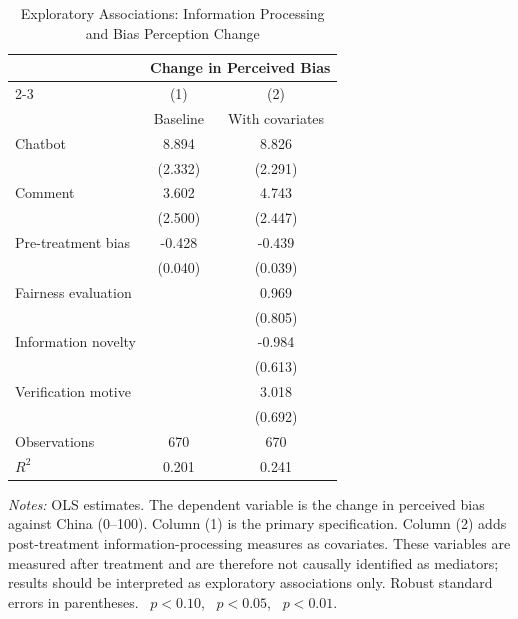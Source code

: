 \begin{table}[htbp]
\centering
\caption{Exploratory Associations: Information Processing and Bias Perception Change}
\label{tab:assoc}
\begin{tabular}{l*{2}{c}}
\toprule
 & \multicolumn{2}{c}{Change in Perceived Bias} \\
\cmidrule(lr){2-3}
                    &\multicolumn{1}{c}{(1)}&\multicolumn{1}{c}{(2)}\\
                    &\multicolumn{1}{c}{Baseline}&\multicolumn{1}{c}{With covariates}\\
\midrule
Chatbot             &       8.894\sym{***}&       8.826\sym{***}\\
                    &     (2.332)         &     (2.291)         \\
\addlinespace
Comment             &       3.602         &       4.743\sym{*}  \\
                    &     (2.500)         &     (2.447)         \\
\addlinespace
Pre-treatment bias  &      -0.428\sym{***}&      -0.439\sym{***}\\
                    &     (0.040)         &     (0.039)         \\
\addlinespace
Fairness evaluation &                     &       0.969         \\
                    &                     &     (0.805)         \\
\addlinespace
Information novelty &                     &      -0.984         \\
                    &                     &     (0.613)         \\
\addlinespace
Verification motive &                     &       3.018\sym{***}\\
                    &                     &     (0.692)         \\
\midrule
Observations        &         670         &         670         \\
$R^2$               &       0.201         &       0.241         \\
\bottomrule
\end{tabular}
\par\vspace{4pt}
\begin{minipage}{\textwidth}
\footnotesize \textit{Notes:} OLS estimates. The dependent variable is the change in perceived bias against China (0--100). Column (1) is the primary specification. Column (2) adds post-treatment information-processing measures as covariates. These variables are measured after treatment and are therefore not causally identified as mediators; results should be interpreted as exploratory associations only. Robust standard errors in parentheses. \sym{*}~$p<0.10$, \sym{**}~$p<0.05$, \sym{***}~$p<0.01$.
\end{minipage}
\end{table}

